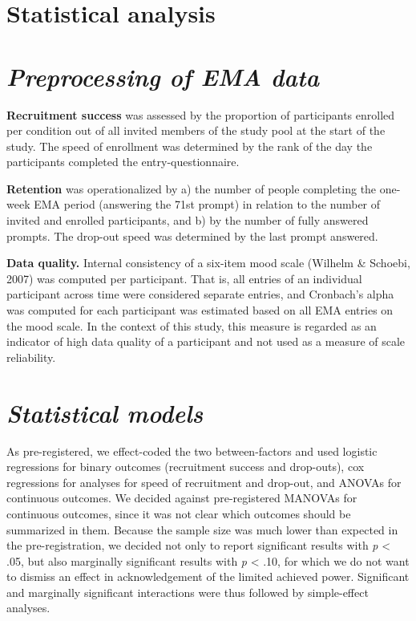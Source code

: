 \documentclass[authordate, empirical]{jote-new-article}
\begin{document}
	\section{\textbf{Statistical analysis}}



	\section{\emph{\textbf{Preprocessing of EMA data}}}



	\textbf{Recruitment success} was assessed by the proportion of participants enrolled per condition out of all invited members of the study pool at the start of the study. The speed of enrollment was determined by the rank of the day the participants completed the entry-questionnaire.



	\textbf{Retention }was operationalized by a) the number of people completing the one-week EMA period (answering the 71st prompt) in relation to the number of invited and enrolled participants, and b) by the number of fully answered prompts. The drop-out speed was determined by the last prompt answered.



	\textbf{Data quality. }Internal consistency of a six-item mood scale (Wilhelm \& Schoebi, 2007) was computed per participant. That is, all entries of an individual participant across time were considered separate entries, and Cronbach's alpha was computed for each participant was estimated based on all EMA entries on the mood scale. In the context of this study, this measure is regarded as an indicator of high data quality of a participant and not used as a measure of scale reliability.



	\section{\emph{\textbf{Statistical models}}}



	As pre-registered, we effect-coded the two between-factors and used logistic regressions for binary outcomes (recruitment success and drop-outs), cox regressions for analyses for speed of recruitment and drop-out, and ANOVAs for continuous outcomes. We decided against pre-registered MANOVAs for continuous outcomes, since it was not clear which outcomes should be summarized in them. Because the sample size was much lower than expected in the pre-registration, we decided not only to report significant results with \emph{p} < .05, but also marginally significant results with \emph{p} < .10, for which we do not want to dismiss an effect in acknowledgement of the limited achieved power. Significant and marginally significant interactions were thus followed by simple-effect analyses.
\end{document}
